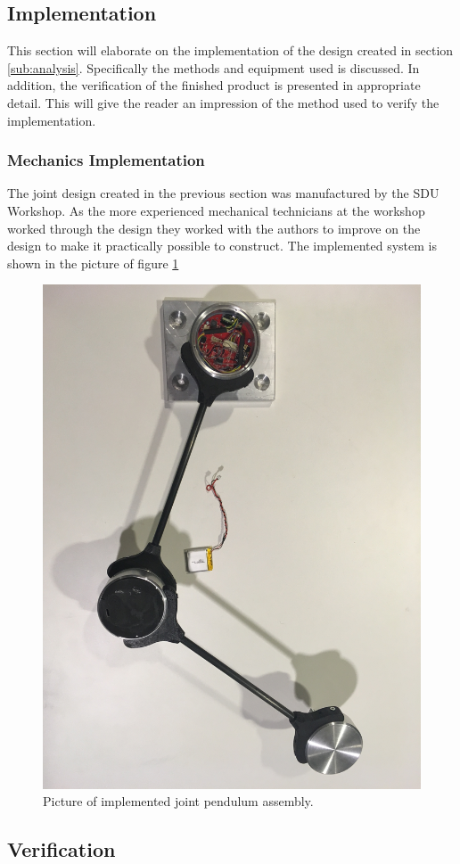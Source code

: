\subsection{Implementation} %
\label{sub:implementation_and_verification}
This section will elaborate on the implementation of the design created in section \ref{sub:analysis}.
Specifically the methods and equipment used is discussed.
In addition, the verification of the finished product is presented in appropriate detail.
This will give the reader an impression of the method used to verify the implementation.
\subsubsection{Mechanics Implementation} %
\label{ssub:mechanics_implementation}
The joint design created in the previous section was manufactured by the SDU Workshop.
As the more experienced mechanical technicians at the workshop worked through the design they worked with the authors to improve on the design to make it practically possible to construct.
The implemented system is shown in the picture of figure \ref{fig:joint_ass_real}

\begin{figure}[h]
	\centering
	\includegraphics[width=0.5\linewidth]{graphics/joint_ass_real}
	\caption[Implemented joint pendulum assembly]{Picture of implemented joint pendulum assembly.}
	\label{fig:joint_ass_real}
\end{figure}

\subsection{Verification}
\label{sub:verification_joint_board_}

